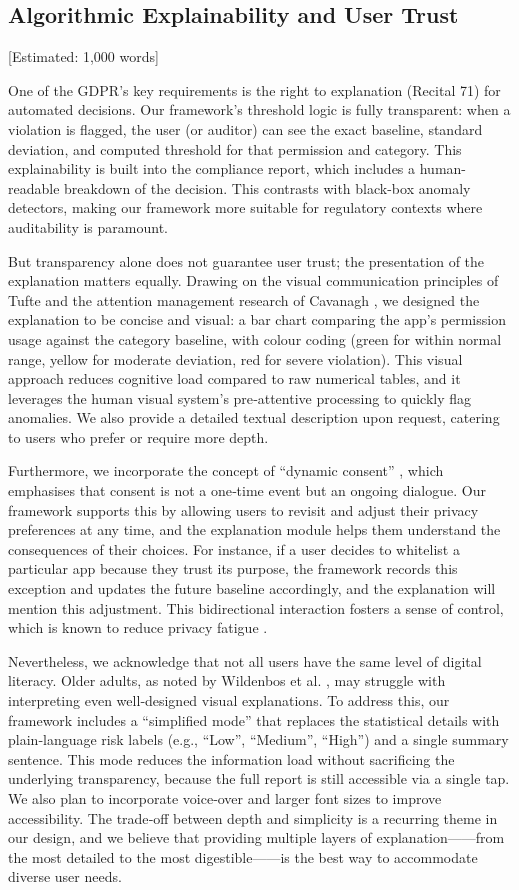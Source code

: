 \subsection{Algorithmic Explainability and User Trust} [Estimated: 1,000 words]

One of the GDPR's key requirements is the right to explanation (Recital 71) for automated decisions. Our framework's threshold logic is fully transparent: when a violation is flagged, the user (or auditor) can see the exact baseline, standard deviation, and computed threshold for that permission and category. This explainability is built into the compliance report, which includes a human-readable breakdown of the decision. This contrasts with black-box anomaly detectors, making our framework more suitable for regulatory contexts where auditability is paramount.

But transparency alone does not guarantee user trust; the presentation of the explanation matters equally. Drawing on the visual communication principles of Tufte \cite{28} and the attention management research of Cavanagh \cite{30}, we designed the explanation to be concise and visual: a bar chart comparing the app's permission usage against the category baseline, with colour coding (green for within normal range, yellow for moderate deviation, red for severe violation). This visual approach reduces cognitive load compared to raw numerical tables, and it leverages the human visual system's pre‑attentive processing to quickly flag anomalies. We also provide a detailed textual description upon request, catering to users who prefer or require more depth.

Furthermore, we incorporate the concept of ``dynamic consent'' \cite{23,24,25}, which emphasises that consent is not a one‑time event but an ongoing dialogue. Our framework supports this by allowing users to revisit and adjust their privacy preferences at any time, and the explanation module helps them understand the consequences of their choices. For instance, if a user decides to whitelist a particular app because they trust its purpose, the framework records this exception and updates the future baseline accordingly, and the explanation will mention this adjustment. This bidirectional interaction fosters a sense of control, which is known to reduce privacy fatigue \cite{10}.

Nevertheless, we acknowledge that not all users have the same level of digital literacy. Older adults, as noted by Wildenbos et al. \cite{36}, may struggle with interpreting even well‑designed visual explanations. To address this, our framework includes a ``simplified mode'' that replaces the statistical details with plain‑language risk labels (e.g., ``Low'', ``Medium'', ``High'') and a single summary sentence. This mode reduces the information load without sacrificing the underlying transparency, because the full report is still accessible via a single tap. We also plan to incorporate voice‑over and larger font sizes to improve accessibility. The trade‑off between depth and simplicity is a recurring theme in our design, and we believe that providing multiple layers of explanation——from the most detailed to the most digestible——is the best way to accommodate diverse user needs.


